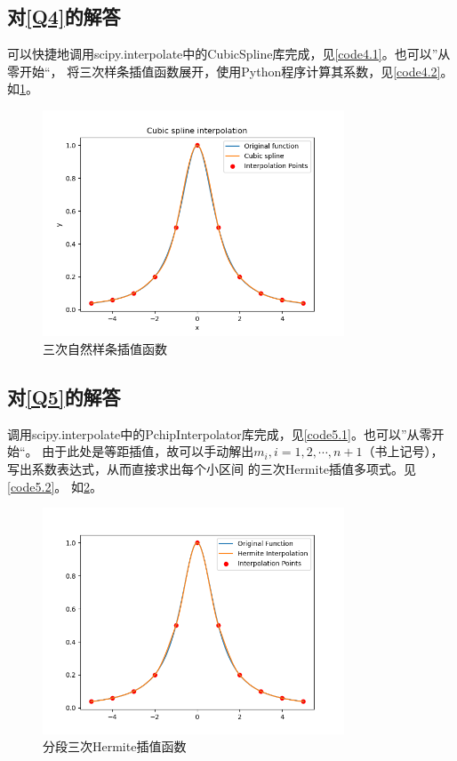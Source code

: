 \documentclass[a4paper,11pt,notitlepage]{article}
\begin{document}
\subsection{对\ref{Q4}的解答}
可以快捷地调用scipy.interpolate中的CubicSpline库完成，见\cref{code4.1}。也可以”从零开始“，
将三次样条插值函数展开，使用Python程序计算其系数，见\cref{code4.2}。
如\cref{pic:4}。
\begin{figure}[H]
    \centering
    \includegraphics[width=0.8\textwidth]{../picture/Fourth_Week_1D.png}
    \caption{三次自然样条插值函数}
    \label{pic:4}
\end{figure}

\subsection{对\ref{Q5}的解答}
调用scipy.interpolate中的PchipInterpolator库完成，见\cref{code5.1}。也可以”从零开始“。
由于此处是等距插值，故可以手动解出$m_{i},i=1,2,\cdots,n+1$（书上记号），写出系数表达式，从而直接求出每个小区间
的三次Hermite插值多项式。见\cref{code5.2}。
如\cref{pic:5}。
\begin{figure}[H]
    \centering
    \includegraphics[width=0.8\textwidth]{../picture/Fourth_Week_1E.png}
    \caption{分段三次Hermite插值函数}
    \label{pic:5}
\end{figure}
\end{document}
